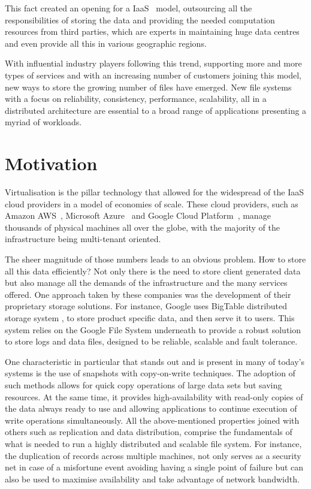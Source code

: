 This fact created an opening for a \gls{IaaS}~\cite{Mell2011} model, outsourcing all the responsibilities of storing the data and providing the needed computation resources from third parties, which are experts in maintaining huge data centres and even provide all this in various geographic regions.

With influential industry players following this trend, supporting more and more types of services and with an increasing number of customers joining this model, new ways to store the growing number of files have emerged. New file systems with a focus on reliability, consistency, performance, scalability, all in a distributed architecture are essential to a broad range of applications presenting a myriad of workloads.



\section{Motivation} %
\label{sec:intro_motivation}

Virtualisation is the pillar technology that allowed for the widespread of the IaaS cloud providers in a model of economies of scale. These cloud providers, such as Amazon AWS~\cite{aws_2017}, Microsoft Azure~\cite{azure_2017} and Google Cloud Platform~\cite{gcp_2017}, manage thousands of physical machines all over the globe, with the majority of the infrastructure being multi-tenant oriented. 

The sheer magnitude of those numbers leads to an obvious problem. How to store all this data efficiently? Not only there is the need to store client generated data but also manage all the demands of the infrastructure and the many services offered. One approach taken by these companies was the development of their proprietary storage solutions. For instance, Google uses BigTable distributed storage system \cite{Chang2006}, to store product specific data, and then serve it to users. This system relies on the Google File System underneath to provide a robust solution to store logs and data files, designed to be reliable, scalable and fault tolerance.

One characteristic in particular that stands out and is present in many of today's systems is the use of snapshots with copy-on-write techniques. The adoption of such methods allows for quick copy operations of large data sets but saving resources. At the same time, it provides high-availability with read-only copies of the data always ready to use and allowing applications to continue execution of write operations simultaneously.
All the above-mentioned properties joined with others such as replication and data distribution, comprise the fundamentals of what is needed to run a highly distributed and scalable file system. For instance, the duplication of records across multiple machines, not only serves as a security net in case of a misfortune event avoiding having a single point of failure but can also be used to maximise availability and take advantage of network bandwidth. 

